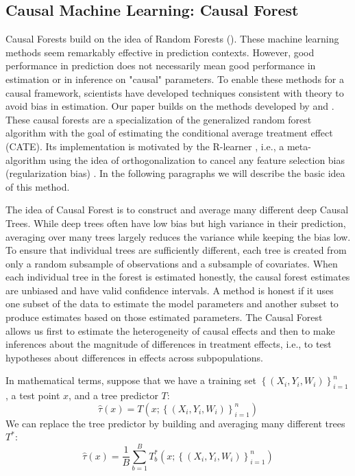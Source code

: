 \subsection{Causal Machine Learning: Causal Forest}
Causal Forests build on the idea of Random Forests (\cite{breiman2001random}). These machine learning methods seem remarkably effective in prediction contexts. However, good performance in prediction does not necessarily mean good performance in estimation or in inference on "causal" parameters. To enable these methods for a causal framework, scientists have developed techniques consistent with theory to avoid bias in estimation. Our paper builds on the methods developed by \cite{athey2019generalized} and \cite{wager2018estimation}. These causal forests are a specialization of the generalized random forest algorithm with the goal of estimating the conditional average treatment effect (CATE). Its implementation is motivated by the R-learner \cite{niewager}, i.e., a meta-algorithm using the idea of orthogonalization to cancel any feature selection bias (regularization bias) \citep[p. 5]{athey2019generalized}. In the following paragraphs we will describe the basic idea of this method.

The idea of Causal Forest is to construct and average many different deep Causal Trees. While deep trees often have low bias but high variance in their prediction, averaging over many trees largely reduces the variance while keeping the bias low. To ensure that individual trees are sufficiently different, each tree is created from only a random subsample of observations and a subsample of covariates. When each individual tree in the forest is estimated honestly, the causal forest estimates are unbiased and have valid confidence intervals. A method is honest if it uses one subset of the data to estimate the model parameters and another subset to produce estimates based on those estimated parameters. The Causal Forest allows us first to estimate the heterogeneity of causal effects and then to make inferences about the magnitude of differences in treatment effects, i.e., to test hypotheses about differences in effects across subpopulations.

In mathematical terms, suppose that we have a training set $\left\{\left(X_i, Y_i, W_i\right)\right\}_{i=1}^n$, a test point $x$, and a tree predictor $T$:
$$
\hat{\tau}(x)=T\left(x ;\left\{\left(X_i, Y_i, W_i\right)\right\}_{i=1}^n\right)
$$
We can replace the tree predictor by building and averaging many different trees $T^*$:
$$
\hat{\tau}(x)=\frac{1}{B} \sum_{b=1}^B T_b^*\left(x ;\left\{\left(X_i, Y_i, W_i\right)\right\}_{i=1}^n\right)
$$


